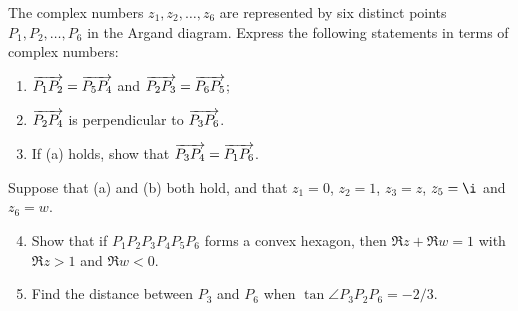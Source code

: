 \begin{problem}
    The complex numbers $z_1, z_2, \dots, z_6$ are represented by six distinct points $P_1, P_2, \dots, P_6$ in the Argand diagram. Express the following statements in terms of complex numbers:
    \begin{enumerate}
        \item $\overrightarrow{P_1 P_2} = \overrightarrow{P_5 P_4}$ and $\overrightarrow{P_2 P_3} = \overrightarrow{P_6 P_5}$;
        \item $\overrightarrow{P_2 P_4}$ is perpendicular to $\overrightarrow{P_3 P_6}$.
        \item If (a) holds, show that $\overrightarrow{P_3 P_4} = \overrightarrow{P_1 P_6}$.
    \end{enumerate}

    Suppose that (a) and (b) both hold, and that $z_1 = 0$, $z_2 = 1$, $z_3 = z$, $z_5 = \i$ and $z_6 = w$.

    \begin{enumerate}
        \setcounter{enumi}{3}
        \item Show that if $P_1 P_2 P_3 P_4 P_5 P_6$ forms a convex hexagon, then $\Re{z} + \Re{w} = 1$ with $\Re{z} > 1$ and $\Re{w} < 0$.
        \item Find the distance between $P_3$ and $P_6$ when $\tan \angle P_3 P_2 P_6 = -2/3$.
    \end{enumerate}
\end{problem}
